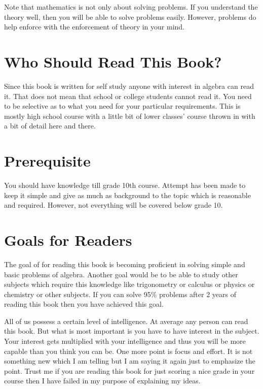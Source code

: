 Note that mathematics is not only about solving problems. If you understand the theory well, then you will be able to solve
problems easily. However, problems do help enforce with the enforcement of theory in your mind.

\section*{Who Should Read This Book?}
Since this book is written for self study anyone with interest in algebra can read it. That does not mean that school or college
students cannot read it. You need to be selective as to what you need for your particular requirements. This is mostly high school
course with a little bit of lower classes' course thrown in with a bit of detail here and there.

\section*{Prerequisite}
You should have knowledge till grade 10th course. Attempt has been made to keep it simple and give as much as background to the
topic which is reasonable and required. However, not everything will be covered below grade 10.

\section*{Goals for Readers}
The goal of for reading this book is becoming proficient in solving simple and basic problems of algebra. Another goal would be to
be able to study other subjects which require this knowledge like trigonometry or calculus or physics or chemistry or other
subjects. If you can solve 95\% problems after 2 years of reading this book then you have achieved this goal.

All of us possess a certain level of intelligence. At average any person can read this book. But what is most important is you have
to have interest in the subject. Your interest gets multiplied with your intelligence and thus you will be more capable than you
think you can be. One more point is focus and effort. It is not something new which I am telling but I am saying it again just to
emphasize the point. Trust me if you are reading this book for just scoring a nice grade in your course then I have failed in my
purpose of explaining my ideas.


